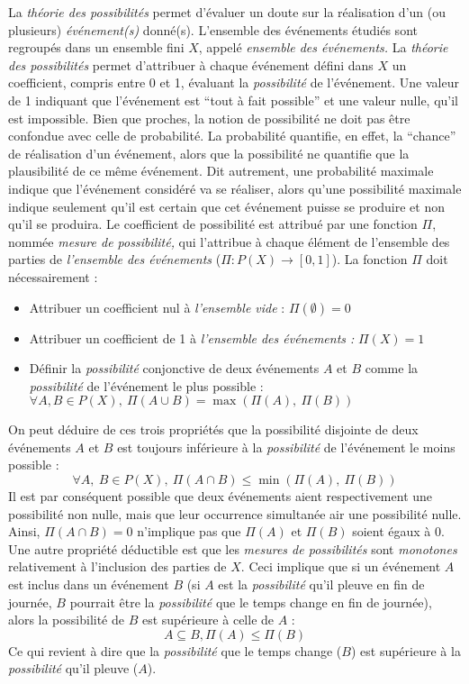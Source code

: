 La \emph{théorie des possibilités} permet d'évaluer un doute sur la
réalisation d'un (ou plusieurs) \emph{événement(s)}
donné(s). L'ensemble des événements étudiés sont regroupés dans un
ensemble fini \(X\), appelé \emph{ensemble des événements.} La
\emph{théorie des possibilités} permet d'attribuer à chaque événement
défini dans \(X\) un coefficient, compris entre 0 et 1, évaluant la
\emph{possibilité} de l'événement. Une valeur de 1 indiquant que
l'événement est \enquote{tout à fait possible}
\autocite[p. 43]{Bouchon-Meunier2007} et une valeur nulle, qu'il est
impossible. Bien que proches, la notion de possibilité ne doit pas
être confondue avec celle de probabilité. La probabilité quantifie, en
effet, la \enquote{chance} de réalisation d'un événement, alors que la
possibilité ne quantifie que la plausibilité de ce même événement. Dit
autrement, une probabilité maximale indique que l'événement considéré
va se réaliser, alors qu'une possibilité maximale indique seulement
qu'il est certain que cet événement puisse se produire et non qu'il se
produira.  Le coefficient de possibilité est attribué par une fonction
\(Π\), nommée \emph{mesure de possibilité,} qui l'attribue à chaque
élément de l'ensemble des parties de \emph{l'ensemble des événements}
(\(Π : P(X) → [0,1]\)). La fonction \(Π\) doit nécessairement :

\begin{itemize}
\item Attribuer un coefficient nul à \emph{l'ensemble vide} :
  \(Π(∅)=0\)
\item Attribuer un coefficient de 1 à \emph{l'ensemble des événements
    :} \(Π(X)=1\)
\item Définir la \emph{possibilité} conjonctive de deux événements
  \(A\) et \(B\) comme la \emph{possibilité} de l'événement le plus
  possible : \(∀ A,B ∈ P(X),\ Π(A ∪ B) = \max(Π(A),\ Π(B))\)
\end{itemize}

On peut déduire de ces trois propriétés \autocite{Bouchon-Meunier2007}
que la possibilité disjointe de deux événements \(A\) et \(B\) est
toujours inférieure à la \emph{possibilité} de l'événement le moins
possible :
%
\begin{equation}
  ∀ A,\ B ∈ P(X),\ Π(A ∩ B) ≤ \min(Π(A),\ Π(B))
\end{equation}
%
Il est par conséquent possible que deux événements aient
respectivement une possibilité non nulle, mais que leur occurrence
simultanée air une possibilité nulle. Ainsi, \( Π(A ∩ B) = 0\)
n'implique pas que \(Π(A)\) et \(Π(B)\) soient égaux à 0. Une autre
propriété déductible est que les \emph{mesures de possibilités} sont
\emph{monotones} relativement à l'inclusion des parties de \(X\). Ceci
implique que si un événement \(A\) est inclus dans un événement \(B\)
(\eg si \(A\) est la \emph{possibilité} qu'il pleuve en fin de
journée, \(B\) pourrait être la \emph{possibilité} que le temps change
en fin de journée), alors la possibilité de \(B\) est supérieure à
celle de \(A\) :
%
\begin{equation}
  A \subseteq B, Π(A) ≤ Π(B)
\end{equation}
%
Ce qui revient à dire que la \emph{possibilité} que le temps change
(\(B\)) est supérieure à la \emph{possibilité} qu'il pleuve (\(A\)).

